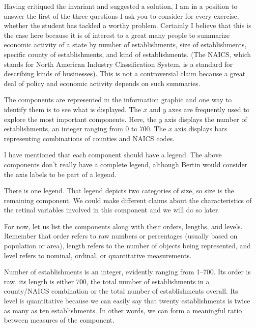 Having critiqued the invariant and suggested a solution, I am in a
position to answer the first of the three questions I ask you to
consider for every exercise, whether the student has tackled a worthy
problem. Certainly I believe that this is the case here because it is of
interest to a great many people to summarize economic activity of a
state by number of establishments, size of establishments, specific
county of establishments, and kind of establishments. (The NAICS, which
stands for North American Industry Classification System, is a standard
for describing kinds of businesses). This is not a controversial claim
because a great deal of policy and economic activity depends on such
summaries.

\hypertarget{the-components}{%
\label{the-components}}

The components are represented in the information graphic and one way to
identify them is to see what is displayed. The \(x\) and \(y\) axes are
frequently used to explore the most important components. Here, the
\(y\) axis displays the number of establishments, an integer ranging
from 0 to 700. The \(x\) axis displays bars representing combinations of
counties and NAICS codes.

I have mentioned that each component should have a legend. The above
components don't really have a complete legend, although Bertin would
consider the axis labels to be part of a legend.

There is one legend. That legend depicts two categories of size, so size
is the remaining component. We could make different claims about the
characteristics of the retinal variables involved in this component and
we will do so later.

For now, let us list the components along with their orders, lengths,
and levels. Remember that order refers to raw numbers or percentages
(usually based on population or area), length refers to the number of
objects being represented, and level refers to nominal, ordinal, or
quantitative measurements.

Number of establishments is an integer, evidently ranging from 1--700.
Its order is raw, its length is either 700, the total number of
establishments in a county/NAICS combination or the total number of
establishments overall. Its level is quantitative because we can easily
say that twenty establishments is twice as many as ten establishments.
In other words, we can form a meaningful ratio between measures of the
component.


